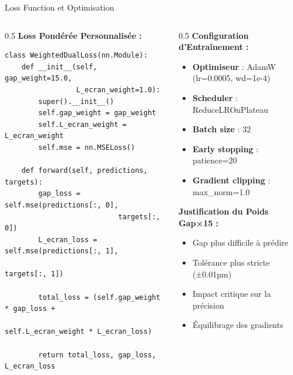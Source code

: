 \documentclass[aspectratio=169]{beamer}
\begin{document}
\begin{frame}[fragile]{Loss Function et Optimisation}
    \begin{columns}
        \begin{column}{0.5\textwidth}
            \textbf{Loss Pondérée Personnalisée :}
            \begin{lstlisting}[caption=WeightedDualLoss]
class WeightedDualLoss(nn.Module):
    def __init__(self, gap_weight=15.0, 
                 L_ecran_weight=1.0):
        super().__init__()
        self.gap_weight = gap_weight
        self.L_ecran_weight = L_ecran_weight
        self.mse = nn.MSELoss()
    
    def forward(self, predictions, targets):
        gap_loss = self.mse(predictions[:, 0], 
                           targets[:, 0])
        L_ecran_loss = self.mse(predictions[:, 1], 
                               targets[:, 1])
        
        total_loss = (self.gap_weight * gap_loss + 
                     self.L_ecran_weight * L_ecran_loss)
        
        return total_loss, gap_loss, L_ecran_loss
            \end{lstlisting}
        \end{column}
        \begin{column}{0.5\textwidth}
            \textbf{Configuration d'Entraînement :}
            \begin{itemize}
                \item \textbf{Optimiseur} : AdamW (lr=0.0005, wd=1e-4)
                \item \textbf{Scheduler} : ReduceLROnPlateau
                \item \textbf{Batch size} : 32
                \item \textbf{Early stopping} : patience=20
                \item \textbf{Gradient clipping} : max\_norm=1.0
            \end{itemize}
            
            \vspace{0.3cm}
            \textbf{Justification du Poids Gap×15 :}
            \begin{itemize}
                \item Gap plus difficile à prédire
                \item Tolérance plus stricte (±0.01µm)
                \item Impact critique sur la précision
                \item Équilibrage des gradients
            \end{itemize}
        \end{column}
    \end{columns}
\end{frame}
\end{document}
